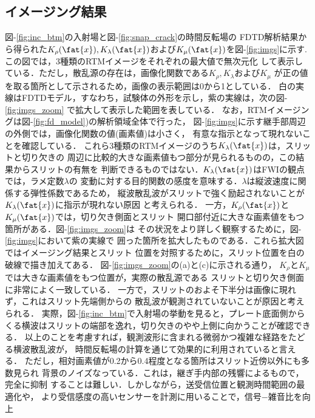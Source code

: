 \subsection{イメージング結果}
{\rm 図}-\ref{fig:inc_btm}の入射場と{\rm 図}-\ref{fig:snap_crack}の時間反転場の
FDTD解析結果から得られた$K_\rho(\fat{x}),K_{\lambda}(\fat{x})$および$K_{\mu}(\fat{x})
$を{図-}\ref{fig:imgs}に示す. この図では，3種類のRTMイメージをそれぞれの最大値で無次元化
して表示している．ただし，散乱源の存在は，画像化関数である$K_\rho,K_\lambda$および$K_\mu$
が正の値を取る箇所として示されるため，画像の表示範囲は0から1としている．
白の実線はFDTDモデル，すなわち，試験体の外形を示し，紫の実線は，次の{\rm 図}-\ref{fig:imgs_zoom}
で拡大して表示した範囲を表している．
なお，RTMイメージングは{\rm 図}-\ref{fig:fd_model})の解析領域全体で行った，
{図-}\ref{fig:imgs}に示す継手部周辺の外側では，画像化関数の値(画素値)は小さく，
有意な指示となって現れないことを確認している．
%
これら3種類のRTMイメージのうち$K_\lambda(\fat{x})$は，スリットと切り欠きの
周辺に比較的大きな画素値もつ部分が見られるものの，この結果からスリットの有無を
判断できるものではない．$K_{\lambda}(\fat{x})$はFWIの観点では，ラメ定数$\lambda$の
変動に対する目的関数の感度を意味する．$\lambda$は縦波速度に関係する弾性係数であるため，
縦波散乱波がスリットで強く励起されないことが$K_\lambda(\fat{x})$に指示が現れない原因
と考えられる．
%
一方，$K_\rho(\fat{x})$と$K_{\mu}(\fat{x})$では，切り欠き側面とスリット
開口部付近に大きな画素値をもつ箇所がある．{\rm 図}-\ref{fig:imgs_zoom}は
その状況をより詳しく観察するために，{\rm 図}-\ref{fig:imgs}において紫の実線で
囲った箇所を拡大したものである．これら拡大図ではイメージング結果とスリット
位置を対照するために，スリット位置を白の破線で描き加えてある．
{\rm 図}-\ref{fig:imgs_zoom}の(a)と(c)に示される通り，
$K_\rho$と$K_\mu$では大きな画素値をもつ位置が，実際の散乱源である
スリットと切り欠き側面に非常によく一致している．
一方で，スリットのおよそ下半分は画像に現れず，これはスリット先端側からの
散乱波が観測されていないことが原因と考えられる．
実際，{\rm 図}-\ref{fig:inc_btm}で入射場の挙動を見ると，プレート底面側から
くる横波はスリットの端部を逸れ，切り欠きのやや上側に向かうことが確認できる．
以上のことを考慮すれば，観測波形に含まれる微弱かつ複雑な経路をたどる横波散乱波が，
時間反転場の計算を通じて効果的に利用されていると言える．
ただし，相対画素値が0.2から0.4程度となる箇所はスリット近傍以外にも多数見られ
背景のノイズなっている．これは，継ぎ手内部の残響によるもので，完全に抑制
することは難しい．しかしながら，送受信位置と観測時間範囲の最適化や，
より受信感度の高いセンサーを計測に用いることで，信号−雑音比を向上

